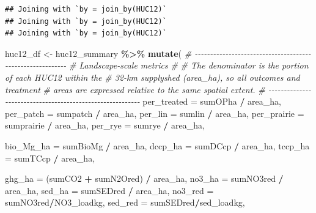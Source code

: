 \documentclass[
]{article}
\newenvironment{Shaded}{\begin{snugshade}}{\end{snugshade}}
\newcommand{\AttributeTok}[1]{\textcolor[rgb]{0.13,0.29,0.53}{#1}}
\newcommand{\CommentTok}[1]{\textcolor[rgb]{0.56,0.35,0.01}{\textit{#1}}}
\newcommand{\FunctionTok}[1]{\textcolor[rgb]{0.13,0.29,0.53}{\textbf{#1}}}
\newcommand{\NormalTok}[1]{#1}
\newcommand{\OtherTok}[1]{\textcolor[rgb]{0.56,0.35,0.01}{#1}}
\newcommand{\SpecialCharTok}[1]{\textcolor[rgb]{0.81,0.36,0.00}{\textbf{#1}}}
\begin{document}
\begin{verbatim}
## Joining with `by = join_by(HUC12)`
## Joining with `by = join_by(HUC12)`
## Joining with `by = join_by(HUC12)`
\end{verbatim}

\begin{Shaded}
\begin{Highlighting}[]
\NormalTok{huc12\_df }\OtherTok{\textless{}{-}}\NormalTok{ huc12\_summary }\SpecialCharTok{\%\textgreater{}\%}
  \FunctionTok{mutate}\NormalTok{(}
    \CommentTok{\# {-}{-}{-}{-}{-}{-}{-}{-}{-}{-}{-}{-}{-}{-}{-}{-}{-}{-}{-}{-}{-}{-}{-}{-}{-}{-}{-}{-}{-}{-}{-}{-}{-}{-}{-}{-}{-}{-}{-}{-}{-}{-}{-}{-}{-}{-}{-}{-}{-}{-}{-}{-}{-}{-}{-}{-}{-}{-}}
    \CommentTok{\# Landscape{-}scale metrics}
    \CommentTok{\#}
    \CommentTok{\# The denominator is the portion of each HUC12 within the}
    \CommentTok{\# 32{-}km supplyshed (\textasciigrave{}area\_ha\textasciigrave{}), so all outcomes and treatment}
    \CommentTok{\# areas are expressed relative to the same spatial extent.}
    \CommentTok{\# {-}{-}{-}{-}{-}{-}{-}{-}{-}{-}{-}{-}{-}{-}{-}{-}{-}{-}{-}{-}{-}{-}{-}{-}{-}{-}{-}{-}{-}{-}{-}{-}{-}{-}{-}{-}{-}{-}{-}{-}{-}{-}{-}{-}{-}{-}{-}{-}{-}{-}{-}{-}{-}{-}{-}{-}{-}{-}}
    \AttributeTok{per\_treated =}\NormalTok{ sumOPha }\SpecialCharTok{/}\NormalTok{ area\_ha,}
    \AttributeTok{per\_patch =}\NormalTok{ sumpatch }\SpecialCharTok{/}\NormalTok{ area\_ha,}
    \AttributeTok{per\_lin =}\NormalTok{ sumlin }\SpecialCharTok{/}\NormalTok{ area\_ha,}
    \AttributeTok{per\_prairie =}\NormalTok{ sumprairie }\SpecialCharTok{/}\NormalTok{ area\_ha,}
    \AttributeTok{per\_rye =}\NormalTok{ sumrye }\SpecialCharTok{/}\NormalTok{ area\_ha,}

    \AttributeTok{bio\_Mg\_ha =}\NormalTok{ sumBioMg }\SpecialCharTok{/}\NormalTok{ area\_ha,}
    \AttributeTok{dccp\_ha =}\NormalTok{ sumDCcp }\SpecialCharTok{/}\NormalTok{ area\_ha,}
    \AttributeTok{tccp\_ha =}\NormalTok{ sumTCcp }\SpecialCharTok{/}\NormalTok{ area\_ha,}

    \AttributeTok{ghg\_ha =}\NormalTok{ (sumCO2 }\SpecialCharTok{+}\NormalTok{ sumN2Ored) }\SpecialCharTok{/}\NormalTok{ area\_ha,}
    \AttributeTok{no3\_ha =}\NormalTok{ sumNO3red }\SpecialCharTok{/}\NormalTok{ area\_ha,}
    \AttributeTok{sed\_ha =}\NormalTok{ sumSEDred }\SpecialCharTok{/}\NormalTok{ area\_ha,}
    \AttributeTok{no3\_red =}\NormalTok{ sumNO3red}\SpecialCharTok{/}\NormalTok{NO3\_loadkg,}
    \AttributeTok{sed\_red =}\NormalTok{ sumSEDred}\SpecialCharTok{/}\NormalTok{sed\_loadkg,}
    

\end{Highlighting}
\end{Shaded}
\end{document}
